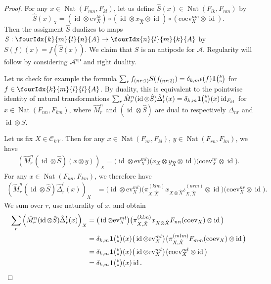 \documentclass[10pt]{article}
\DeclareMathOperator{\id}{id}
\DeclareMathOperator{\Nat}{\mathrm{Nat}}
\newcommand{\ev}{\mathrm{ev}}
\newcommand{\coev}{\mathrm{coev}}
\newcommand{\Grt}[3]{#1{\tiny {\begin{pmatrix} #2\\#3\end{pmatrix}}}}
\newcommand{\UnitC}[2]{\Grt{\mathbf{1}}{#1}{#2}}
\newcommand{\Gr}[5]{\fourIdx{#2}{#4}{#3}{#5}{#1}}%
\theoremstyle{definition}
\numberwithin{equation}{section}
\begin{document}
\begin{proof} 
  For any $x\in \Nat(F_{mn},F_{kl})$, let us define $\hat{S}(x) \in
  \Nat(F_{lk},F_{nm})$ by \[\hat{S}(x)_X = 
(\id \otimes \ev^{lk}_{X}) \circ (\id \otimes x_{\hat X}
  \otimes \id) \circ (\coev^{nm}_{X} \otimes \id).\]
Then the assigment $\hat{S}$ dualizes to maps $S:\Gr{A}{k}{l}{m}{n} \rightarrow \Gr{A}{n}{m}{l}{k}$ by $S(f)(x) = f(\hat{S}(x))$. We claim that $S$ is an antipode for $\mathscr{A}$. Regularity will follow by considering $\mathscr{A}^{\textrm{op}}$ and right duality.

Let us check for example the formula $\sum_r f_{(nr;1)} S(f_{(nr;2)}) = \delta_{k,m}\epsilon(f)\UnitC{k}{n}$ for $f\in \Gr{A}{k}{l}{m}{l}$. By duality, this is equivalent to the pointwise identity of natural transformations $\sum_r\hat{M}^n_r(\id\otimes \hat{S})\hat{\Delta}^l_r(x) = \delta_{k,m}\UnitC{k}{n}(x) \id_{F_{kl}}$ for $x\in \Nat(F_{nn},F_{km})$, where $\hat{M}^n_r$ and $(\id\otimes \hat{S})$ are dual to respectively $\Delta_{nr}$ and $\id\otimes S$. 

Let us fix $X\in \mathcal{C}_{k'l'}$. Then for any $x\in
\Nat(F_{nr},F_{kl})$, $y\in \Nat(F_{rn},F_{lm})$, we have
\begin{align*}
  \left(\hat{M}^n_r(\id\otimes \hat{S})(x\otimes y)\right)_X =
\big(\id \otimes \ev_{X}^{ml}\big)  \big(x_{X} \otimes y_{\hat X} \otimes \id\big) 
  \big(\coev_{X}^{nr} \otimes \id\big).
\end{align*}
For any $x\in \Nat(F_{nn},F_{km})$, we therefore have
\begin{align*}
  \left(\hat{M}^n_r(\id\otimes \hat{S})\hat\Delta^{l}_{r}(x)\right)_X &=
\big(\id \otimes \ev^{ml}_{X}\big)  \big(\pi^{(klm)}_{X,\hat X}x_{X\otimes \hat
    X}\iota^{(nrm)}_{X,\hat X} \otimes \id\big) 
  \big(\coev^{nr}_{X} \otimes \id\big).
\end{align*}
We sum over $r$, use naturality of $x$, and obtain
\begin{align*}
\sum_{r}    \left(\hat{M}^n_r(\id\otimes
  \hat{S})\hat\Delta^{l}_{r}(x)\right)_X &=
\big(\id \otimes \ev_{X}^{ml}\big) \big(\pi^{(klm)}_{X,\hat X}x_{X\otimes \hat
    X}F_{nn}(\coev_{X}) \otimes \id\big) \\
  &=\delta_{k,m} \UnitC{k}{n}(x)
\big(\id \otimes \ev_{X}^{ml}\big) 
\big(\pi^{(mlm)}_{X,\hat X}F_{mm}(\coev_{X})
  \otimes \id\big) \\
  &=\delta_{k,m} \UnitC{k}{n}(x)
\big(\id \otimes \ev_{X}^{ml}\big) 
\big(\coev^{ml}_{X}
  \otimes \id\big) \\
  &= \delta_{k,m} \UnitC{k}{n}(x) \id. 
\end{align*}
\end{proof} 
\end{document}
